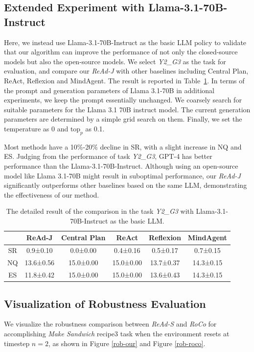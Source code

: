 \documentclass[11pt]{article}
\theoremstyle{plain}
\theoremstyle{remark}
\begin{document}
\subsection{Extended Experiment with Llama-3.1-70B-Instruct}\label{app:open_source_llm}
Here, we instead use Llama-3.1-70B-Instruct \citep{dubey2024llama3} as the basic LLM policy to validate that our algorithm can improve the performance of not only the closed-source models but also the open-source models. We select \emph{Y2\_G3} as the task for evaluation, and compare our \emph{ReAd-J} with other baselines including Central Plan, ReAct, Reflexion and MindAgent. The result is reported in Table~\ref{table:open_source_llm}. In terms of the prompt and generation parameters of Llama 3.1-70B in additional experiments, we keep the prompt essentially unchanged. We coarsely search for suitable parameters for the Llama 3.1 70B instruct model. The current generation parameters are determined by a simple grid search on them. Finally, we set the temperature as 0 and $\text{top}_p$ as 0.1.

Most methods have a 10\%-20\% decline in SR, with a slight increase in NQ and ES. Judging from the performance of task \emph{Y2\_G3}, GPT-4 has better performance than the Llama-3.1-70B-Instruct. Although using an open-source model like Llama 3.1-70B might result in suboptimal performance, our \emph{ReAd-J} significantly outperforms other baselines based on the same LLM, demonstrating the effectiveness of our method.

\begin{table}[h]
\caption{The detailed result of the comparison in the task \emph{Y2\_G3} with Llama-3.1-70B-Instruct as the basic LLM.}
\centering
\begin{tabular}{cccccc}
\toprule     
& ReAd-J & Central Plan  &  ReAct & Reflexion & MindAgent \\
\midrule 
SR & 0.9±0.10 & 0.0±0.00   &  0.4±0.16 & 0.5±0.17 & 0.7±0.15 \\
NQ & 13.6±0.56 & 15.0±0.00 & 15.0±0.00 &  13.7±0.37 & 14.3±0.15 \\
ES & 11.8±0.42 & 15.0±0.00 & 15.0±0.00 & 13.6±0.43 & 14.3±0.15 \\
\bottomrule     
\end{tabular}
\label{table:open_source_llm}
\end{table}



\subsection{Visualization of Robustness Evaluation}
\label{rob-test-graph}
We visualize the robustness comparison between \emph{ReAd-S} and \emph{RoCo} for accomplishing \emph{Make Sandwich} recipe3 task when the environment resets at timestep $n=2$, as shown in Figure \ref{rob-our} and Figure \ref{rob-roco}.
\end{document}
